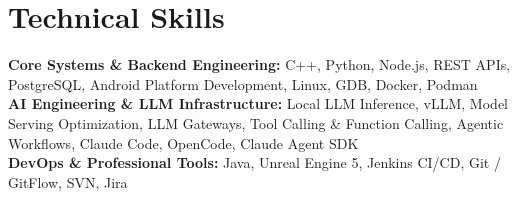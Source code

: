 \documentclass[letterpaper,10pt]{article}
\begin{document}
\section{Technical Skills}
 \begin{itemize}[leftmargin=0.15in, label={}]
    \small{\item{
     \textbf{Core Systems \& Backend Engineering:} C++, Python, Node.js, REST APIs, PostgreSQL, Android Platform Development, Linux, GDB, Docker, Podman \\ \textbf{AI Engineering \& LLM Infrastructure:} Local LLM Inference, vLLM, Model Serving Optimization, LLM Gateways, Tool Calling \& Function Calling, Agentic Workflows, Claude Code, OpenCode, Claude Agent SDK \\ \textbf{DevOps \& Professional Tools:} Java, Unreal Engine 5, Jenkins CI/CD, Git / GitFlow, SVN, Jira
    }}
 \end{itemize}

\end{document}
